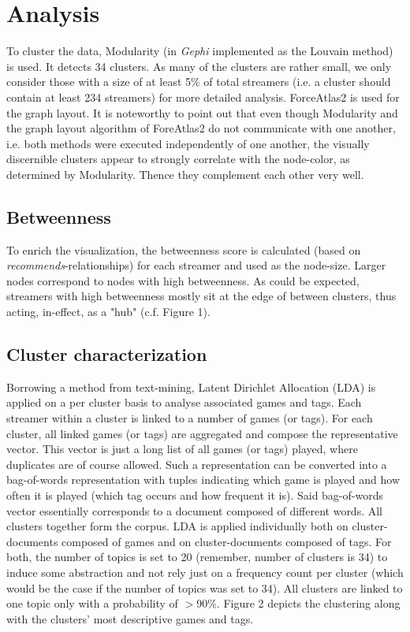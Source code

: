 \documentclass[11pt, oneside]{article}   	%
\begin{document}
\section{Analysis}

To cluster the data, Modularity (in \textit{Gephi} implemented as the Louvain method) is used. It detects 34 clusters. As many of the clusters are rather small, we only consider those with a size of at least 5\% of total streamers (i.e. a cluster should contain at least 234 streamers) for more detailed analysis.
ForceAtlas2 is used for the graph layout.
\newline
It is noteworthy to point out that even though Modularity and the graph layout algorithm of ForeAtlas2 do not communicate with one another, i.e. both methods were executed independently of one another, the visually discernible clusters appear to strongly correlate with the node-color, as determined by Modularity. Thence they complement each other very well.
\subsection{Betweenness}
To enrich the visualization, the betweenness score is calculated (based on \textit{recommends}-relationships) for each streamer and used as the node-size. Larger nodes correspond to nodes with high betweenness. As could be expected, streamers with high betweenness mostly sit at the edge of between clusters, thus acting, in-effect, as a "hub" (c.f. Figure 1).

\subsection{Cluster characterization}
Borrowing a method from text-mining, Latent Dirichlet Allocation (LDA) is applied on a per cluster basis to analyse associated games and tags.
\newline
Each streamer within a cluster is linked to a number of games (or tags). For each cluster, all linked games (or tags) are aggregated and compose the representative vector. This vector is just a long list of all games (or tags) played, where duplicates are of course allowed. Such a representation can be converted into a bag-of-words representation with tuples indicating which game is played and how often it is played (which tag occurs and how frequent it is). Said bag-of-words vector essentially corresponds to a document composed of different words. All clusters together form the corpus.
\newline
LDA is applied individually both on cluster-documents composed of games and on cluster-documents composed of tags. For both, the number of topics is set to 20 (remember, number of clusters is 34) to induce some abstraction and not rely just on a frequency count per cluster (which would be the case if the number of topics was set to 34).
\newline
All clusters are linked to one topic only with a probability of $>$90\%. Figure 2 depicts the clustering along with the clusters' most descriptive games and tags.
\end{document}

